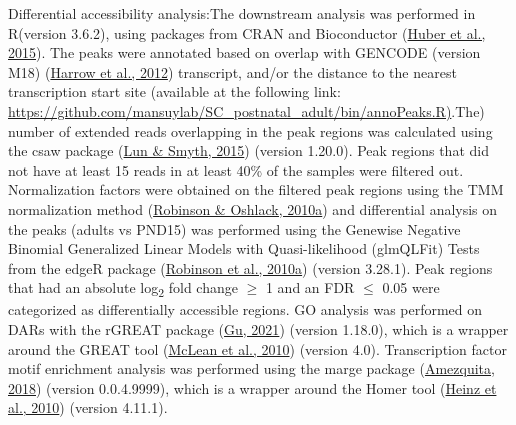 \documentclass[12pt,twoside]{reedthesis}
\begin{document}
Differential accessibility analysis:The downstream analysis was
performed in R(version 3.6.2), using packages from CRAN and Bioconductor
(\protect\hyperlink{ref-huber2015}{Huber et al., 2015}). The peaks were annotated based on overlap with GENCODE
(version M18) (\protect\hyperlink{ref-harrow2012}{Harrow et al., 2012}) transcript, and/or the distance to the
nearest transcription start site (available at the following link:
\href{https://github.com/mansuylab/SC_postnatal_adult/bin/annoPeaks.R}{https://github.com/mansuylab/SC\_postnatal\_adult/bin/annoPeaks.R)}.The)
number of extended reads overlapping in the peak regions was calculated
using the csaw package (\protect\hyperlink{ref-lun2015}{Lun \& Smyth, 2015}) (version 1.20.0). Peak regions that
did not have at least 15 reads in at least 40\% of the samples were
filtered out. Normalization factors were obtained on the filtered peak
regions using the TMM normalization method (\protect\hyperlink{ref-robinson2010a}{Robinson \& Oshlack, 2010a}) and
differential analysis on the peaks (adults vs PND15) was performed using
the Genewise Negative Binomial Generalized Linear Models with
Quasi-likelihood (glmQLFit) Tests from the edgeR package (\protect\hyperlink{ref-robinson2010}{Robinson et al., 2010a})
(version 3.28.1). Peak regions that had an absolute log\textsubscript{2} fold change
\(\geq\) 1 and an FDR \(\leq\) 0.05 were categorized as differentially
accessible regions. GO analysis was performed on DARs with the rGREAT
package (\protect\hyperlink{ref-gu2021}{Gu, 2021}) (version 1.18.0), which is a wrapper around the GREAT
tool (\protect\hyperlink{ref-mclean2010}{McLean et al., 2010}) (version 4.0). Transcription factor motif enrichment
analysis was performed using the marge package (\protect\hyperlink{ref-amezquita2018}{Amezquita, 2018}) (version
0.0.4.9999), which is a wrapper around the Homer tool (\protect\hyperlink{ref-heinz2010}{Heinz et al., 2010})
(version 4.11.1).
\end{document}
